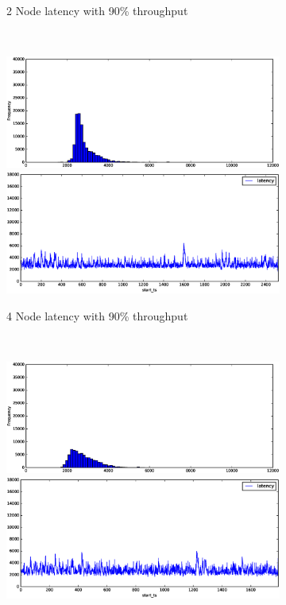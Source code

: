 \begin{figure}
\begin{subfigure}[b]{0.3\textwidth}
        \caption{2 Node latency with 90\% throughput }
    \end{subfigure}
    ~ 
    \begin{subfigure}[b]{0.3\textwidth}
        \includegraphics[width=\textwidth]{eps/spark_agg_4node_th_90_hist}
         \includegraphics[width=\textwidth]{eps/spark_agg_4node_th_90_ts}

        \caption{4 Node latency with 90\% throughput }
    \end{subfigure}
    ~ 
    \begin{subfigure}[b]{0.3\textwidth}
        \includegraphics[width=\textwidth]{eps/spark_agg_8node_th_90_hist}
         \includegraphics[width=\textwidth]{eps/spark_agg_8node_th_90_ts}


\end{subfigure}
\end{figure}
